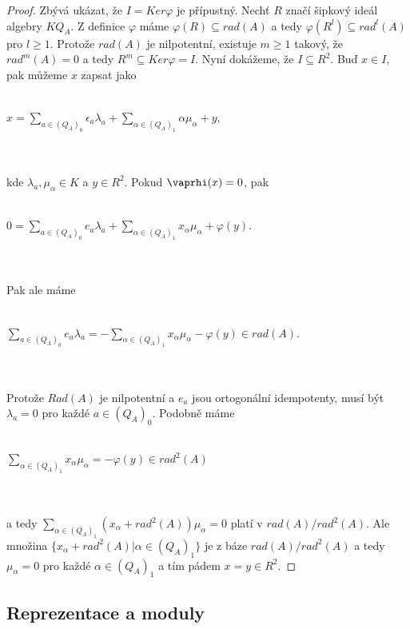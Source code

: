\begin{proof}
      Zbývá ukázat, že $I=Ker\varphi$ je přípustný. Nechť $R$ značí šipkový 
      ideál algebry $KQ_A$. Z definice $\varphi$ máme $\varphi(R)\subseteq 
      rad(A)$ a tedy $\varphi(R^l)\subseteq rad^l(A)$ pro $l\geq 1$. Protože $rad(A)$ 
      je nilpotentní, existuje $m\geq 1$ takový, že $rad^m(A)=0$ a tedy $R^m\subseteq 
      Ker\varphi=I$. Nyní dokážeme, že $I\subseteq R^2$. Buď $x\in I$, pak 
     můžeme $x$ zapsat jako
     \\\\\centerline{$
       x
       =\sum_{a\in (Q_A)_0}\epsilon_a\lambda_a
       +\sum_{\alpha\in (Q_A)_1}\alpha\mu_\alpha+y
     $,}\\\\
     kde $\lambda_a,\mu_\alpha\in K$ a $y\in R^2$. Pokud $\vaprhi(x)=0$, pak 
     \\\\\centerline{$
       0
       =\sum_{a\in (Q_A)_0}e_a\lambda_a
       +\sum_{\alpha\in (Q_A)_1}x_\alpha\mu_\alpha+\varphi(y)
     $.}\\\\
     Pak ale máme
     \\\\\centerline{$
       \sum_{a\in (Q_A)_0}e_a\lambda_a
       =-\sum_{\alpha\in (Q_A)_1}x_\alpha\mu_\alpha-\varphi(y)
       \in rad(A)
     $.}\\\\
     Protože $Rad(A)$ je nilpotentní a $e_a$ jsou ortogonální idempotenty, musí být $\lambda_a=0$ 
     pro každé $a\in (Q_A)_0$. Podobně máme 
     \\\\\centerline{$
       \sum_{\alpha\in (Q_A)_1}x_\alpha\mu_\alpha
       =-\varphi(y)
       \in rad^2(A)
     $}\\\\
     a tedy $\sum_{\alpha\in (Q_A)_1}(x_\alpha+rad^2(A))\mu_\alpha=0$ platí v 
     $rad(A)/rad^2(A)$. Ale množina $\{x_\alpha+rad^2(A)|\alpha\in (Q_A)_1\}$ je 
     z  báze $rad(A)/rad^2(A)$ a tedy $\mu_\alpha=0$ pro každé 
     $\alpha\in (Q_A)_1$ a tím pádem $x=y\in R^2$.
    \end{proof}

  \subsection{Reprezentace a moduly}
  
